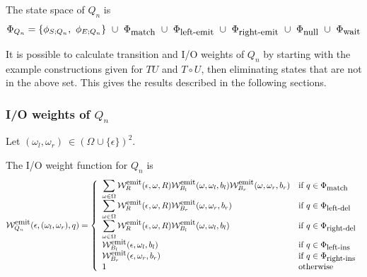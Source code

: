\documentclass{article}
\newcommand\gappedalphabet[1]{(\Omega_{#1} \cup \{\epsilon\})}
\newcommand\gapsquared{\gappedalphabet{}^2}
\newcommand\compose{}
\newcommand\fork{\circ}
\newcommand\States{\Phi}
\newcommand\statesof[1]{\States_{#1}}
\newcommand\startstateof[1]{\phi_{S;#1}}
\newcommand\laststateof[1]{\phi_{E;#1}}
\newcommand\weight{{\cal W}}
\newcommand\weightfunof[1]{\weight_{#1}}
\newcommand\emitweightfun[1]{\weightfunof{#1}^{\mbox{\small emit}}}
\newcommand\stateset[1]{\statesof{\mbox{\small #1}}}
\newcommand\matchsuffix{match}
\newcommand\nullsuffix{null}
\newcommand\leftinsertsuffix{left-ins}
\newcommand\rightinsertsuffix{right-ins}
\newcommand\leftdeletesuffix{left-del}
\newcommand\rightdeletesuffix{right-del}
\newcommand\leftemitsuffix{left-emit}
\newcommand\rightemitsuffix{right-emit}
\newcommand\qwaitsuffix{wait}
\newcommand\matchstates{\stateset{\matchsuffix}}
\newcommand\nullstates{\stateset{\nullsuffix}}
\newcommand\leftinsertstates{\stateset{\leftinsertsuffix}}
\newcommand\rightinsertstates{\stateset{\rightinsertsuffix}}
\newcommand\leftdeletestates{\stateset{\leftdeletesuffix}}
\newcommand\rightdeletestates{\stateset{\rightdeletesuffix}}
\newcommand\leftemitstates{\stateset{\leftemitsuffix}}
\newcommand\rightemitstates{\stateset{\rightemitsuffix}}
\newcommand\qwaitstates{\stateset{\qwaitsuffix}}
\begin{document}
The state space of $Q_n$ is
\[
\statesof{Q_n} = \{ \startstateof{Q_n},\ \laststateof{Q_n} \}\ \cup\ \matchstates\ \cup\ \leftemitstates\ \cup\ \rightemitstates\ \cup\ \nullstates\ \cup\ \qwaitstates
\]

It is possible to calculate transition and I/O weights of $Q_n$
by starting with the example constructions given for $T \compose U$ and $T \fork U$,
then eliminating states that are not in the above set.
This gives the results described in the following sections.

\subsubsection{I/O weights of $Q_n$}

Let $(\omega_l,\omega_r)\ \in \gapsquared$.

The I/O weight function for $Q_n$ is
\[
\emitweightfun{Q_n}(\epsilon,(\omega_l,\omega_r),q) = \left\{
\begin{array}{ll}
\displaystyle
\sum_{\omega \in \Omega} \emitweightfun{R}(\epsilon,\omega,R)
 \emitweightfun{B_l}(\omega,\omega_l,b_l)
 \emitweightfun{B_r}(\omega,\omega_r,b_r)
 & \mbox{if $q \in \matchstates$} \\
\displaystyle
\sum_{\omega \in \Omega} \emitweightfun{R}(\epsilon,\omega,R)
 \emitweightfun{B_r}(\omega,\omega_r,b_r)
 & \mbox{if $q \in \leftdeletestates$} \\
\displaystyle
\sum_{\omega \in \Omega} \emitweightfun{R}(\epsilon,\omega,R)
 \emitweightfun{B_l}(\omega,\omega_l,b_l)
 & \mbox{if $q \in \rightdeletestates$} \\
 \emitweightfun{B_l}(\epsilon,\omega_l,b_l)
 & \mbox{if $q \in \leftinsertstates$} \\
 \emitweightfun{B_r}(\epsilon,\omega_r,b_r)
 & \mbox{if $q \in \rightinsertstates$} \\
1
 & \mbox{otherwise}
\end{array}
\right.
\]
\end{document}
